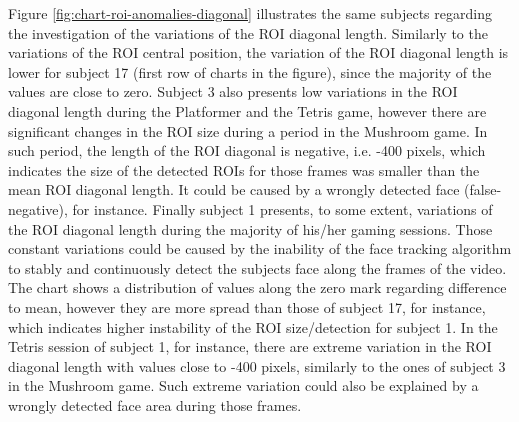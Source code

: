 Figure \ref{fig:chart-roi-anomalies-diagonal} illustrates the same subjects regarding the investigation of the variations of the ROI diagonal length. Similarly to the variations of the ROI central position, the variation of the ROI diagonal length is lower for subject 17 (first row of charts in the figure), since the majority of the values are close to zero. Subject 3 also presents low variations in the ROI diagonal length during the Platformer and the Tetris game, however there are significant changes in the ROI size during a period in the Mushroom game. In such period, the length of the ROI diagonal is negative, i.e. -400 pixels, which indicates the size of the detected ROIs for those frames was smaller than the mean ROI diagonal length. It could be caused by a wrongly detected face (false-negative), for instance. Finally subject 1 presents, to some extent, variations of the ROI diagonal length during the majority of his/her gaming sessions. Those constant variations could be caused by the inability of the face tracking algorithm to stably and continuously detect the subjects face along the frames of the video. The chart shows a distribution of values along the zero mark regarding difference to mean, however they are more spread than those of subject 17, for instance, which indicates higher instability of the ROI size/detection for subject 1. In the Tetris session of subject 1, for instance, there are extreme variation in the ROI diagonal length with values close to -400 pixels, similarly to the ones of subject 3 in the Mushroom game. Such extreme variation could also be explained by a wrongly detected face area during those frames.

